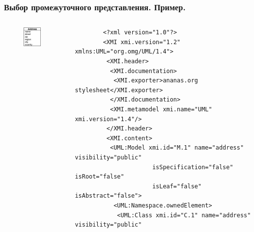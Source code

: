 \documentclass{beamer}
\begin{document}
\begin{frame}[fragile]
\frametitle{Выбор промежуточного представления. Пример.}

\begin{columns}
    \begin{column}[c]{0.2\textwidth}
        \begin{figure}[h!]
            \begin{center}
                \includegraphics[width=0.8\textwidth]{img/xmi_example.png}
            \end{center}
        \end{figure}
    \end{column}
    \begin{column}[c]{0.8\textwidth}
        \begin{adjustbox}{width=0.8\textwidth,keepaspectratio}
        \begin{lstlisting}
        <?xml version="1.0"?>
        <XMI xmi.version="1.2" xmlns:UML="org.omg/UML/1.4">
         <XMI.header>
          <XMI.documentation>
           <XMI.exporter>ananas.org stylesheet</XMI.exporter>
          </XMI.documentation>
          <XMI.metamodel xmi.name="UML" xmi.version="1.4"/>
         </XMI.header>
         <XMI.content>
          <UML:Model xmi.id="M.1" name="address" visibility="public"
                      isSpecification="false" isRoot="false"
                      isLeaf="false" isAbstract="false">
           <UML:Namespace.ownedElement>
            <UML:Class xmi.id="C.1" name="address" visibility="public"

\end{lstlisting}
\end{adjustbox}
\end{column}
\end{columns}
\end{frame}
\end{document}
